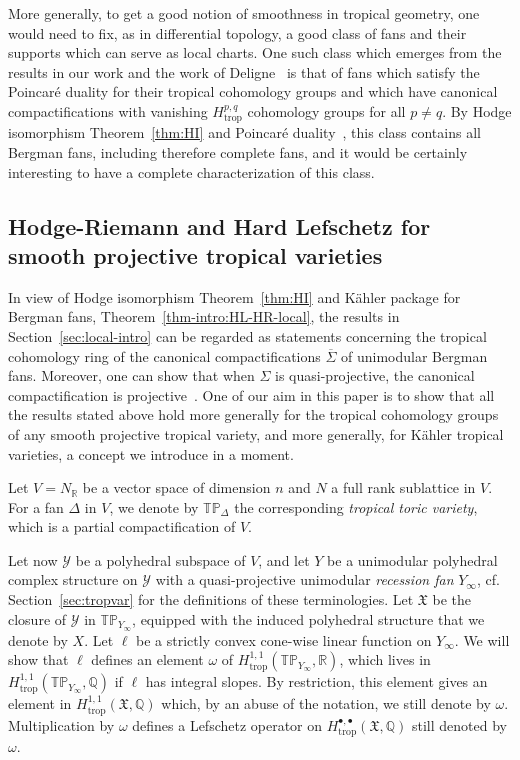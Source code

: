 \documentclass[11pt]{amsart}
\theoremstyle{definition}
\numberwithin{equation}{section}
\newcommand{\cf}[1]{cf.}
\renewcommand{\~}{\widetilde}
\newcommand{\Q}{\mathbb{Q}}
\newcommand{\R}{\mathbb{R}}
\newcommand{\bul}{\bullet} %
\newcommand{\trop}{\mathrm{trop}} %
\newcommand{\TP}{\mathbb{TP}} %
\newcommand{\comp}[1]{\overline{#1}} %
\newcommand{\X}{\mathfrak X}
\newcommand{\Y}{\mathscr Y}
\begin{document}
\smallskip
More generally, to get a good notion of smoothness in tropical geometry, one would need to fix, as in differential topology, a good class of fans and their supports which can serve as local charts. One such class which emerges from the results in our work and the work of Deligne~\cite{deligne-md} is that of fans which satisfy the Poincar\'e duality for their tropical cohomology groups and which have canonical compactifications with vanishing $H^{p,q}_\trop$ cohomology groups for all $p\neq q$. By Hodge isomorphism Theorem~\ref{thm:HI} and Poincar\'e duality~\cites{JSS, JRS19}, this class contains all Bergman fans, including therefore complete fans, and it would be certainly interesting to have a complete characterization of this class.



\subsection{Hodge-Riemann and Hard Lefschetz for smooth projective tropical varieties} In view of Hodge isomorphism Theorem~\ref{thm:HI} and K\"ahler package for Bergman fans, Theorem~\ref{thm-intro:HL-HR-local}, the results in Section~\ref{sec:local-intro} can be regarded as statements concerning the tropical cohomology ring of the canonical compactifications $\comp \Sigma$ of unimodular Bergman fans. Moreover, one can show that when $\Sigma$ is quasi-projective, the canonical compactification is projective~\cite{AP-geom}. One of our aim in this paper is to show that all the results stated above hold more generally for the tropical cohomology groups of any smooth projective tropical variety, and more generally, for K\"ahler tropical varieties, a concept we introduce in a moment.

\medskip

Let $V =N_\R$ be a vector space of dimension $n$ and $N$ a full rank sublattice in $V.$ For a fan $\Delta$ in $V$, we denote by $\TP_{\Delta}$ the corresponding \emph{tropical toric variety}, which is a partial compactification of $V$.

Let now $\Y$ be a polyhedral subspace of $V$, and let $Y$ be a unimodular polyhedral complex structure on $\Y$ with a quasi-projective unimodular \emph{recession fan} $Y_\infty$, \cf. Section~\ref{sec:tropvar} for the definitions of these terminologies. Let $\X$ be the closure of $\Y$ in $\TP_{Y_\infty}$, equipped with the induced polyhedral structure that we denote by $X$. Let $\ell$ be a strictly convex cone-wise linear function on $Y_\infty$. We will show that $\ell$ defines an element $\omega$ of $H_\trop^{1,1}(\TP_{Y_\infty}, \R)$, which lives in $H_\trop^{1,1}(\TP_{Y_\infty}, \Q)$ if $\ell$ has integral slopes. By restriction, this element gives an element in $H_\trop^{1,1}(\X, \Q)$ which, by an abuse of the notation, we still denote by $\omega$. Multiplication by $\omega$ defines a Lefschetz operator on $H_\trop^{\bul, \bul}(\X,\Q)$ still denoted by $\omega$.
\end{document}
